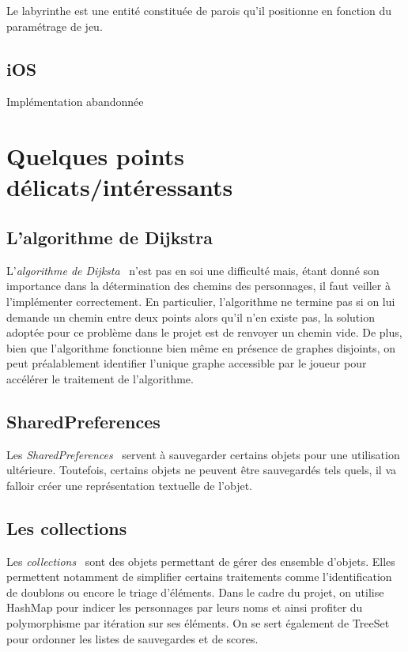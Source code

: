 \documentclass{article}
\begin{document}
Le labyrinthe est une entité constituée de parois qu'il positionne en fonction du paramétrage de jeu. 


\subsection{iOS} %
Implémentation abandonnée

\section{Quelques points délicats/intéressants}

\subsection{L’algorithme de Dijkstra}

L'\textit{algorithme de Dijksta}~\cite{algoDijkstra} n'est pas en soi une difficulté mais, étant donné son importance dans la détermination des chemins des personnages, il faut veiller à l'implémenter correctement. En particulier, l'algorithme ne termine pas si on lui demande un chemin entre deux points alors qu'il n'en existe pas, la solution adoptée pour ce problème dans le projet est de renvoyer un chemin vide. De plus, bien que l'algorithme fonctionne bien même en présence de graphes disjoints, on peut préalablement identifier l'unique graphe accessible par le joueur pour accélérer le traitement de l'algorithme.

\subsection{SharedPreferences}

Les \textit{SharedPreferences}~\cite{sharedPreferences} servent à sauvegarder certains objets pour une utilisation ultérieure. Toutefois, certains objets ne peuvent être sauvegardés tels quels, il va falloir créer une représentation textuelle de l'objet.

\subsection{Les collections}

Les \textit{collections}~\cite{collections} sont des objets permettant de gérer des ensemble d'objets. Elles permettent notamment de simplifier certains traitements comme l'identification de doublons ou encore le triage d'éléments.
Dans le cadre du projet, on utilise HashMap pour indicer les personnages par leurs noms et ainsi profiter du polymorphisme par itération sur ses éléments.
On se sert également de TreeSet pour ordonner les listes de sauvegardes et de scores.
\end{document}
